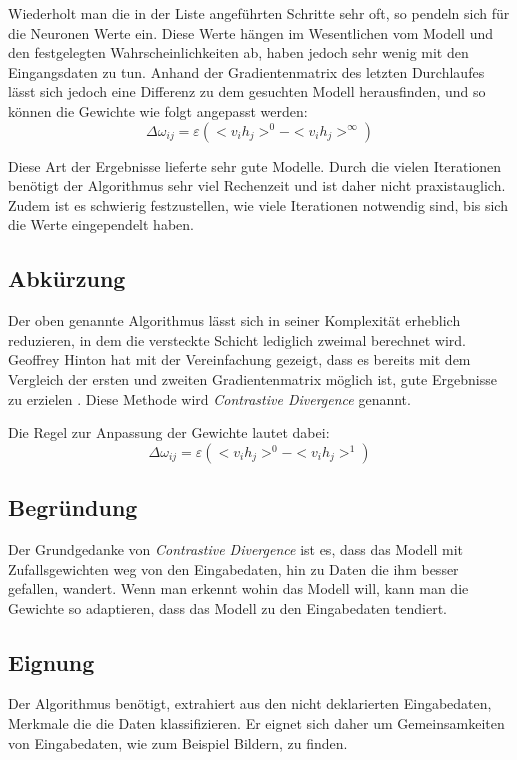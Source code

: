 Wiederholt man die in der Liste angeführten Schritte sehr oft, so pendeln sich für die Neuronen Werte ein. Diese Werte hängen im Wesentlichen vom Modell und den festgelegten Wahrscheinlichkeiten ab, haben jedoch sehr wenig mit den Eingangsdaten zu tun. Anhand der Gradientenmatrix des letzten Durchlaufes lässt sich jedoch eine Differenz zu dem gesuchten Modell herausfinden, und so können die Gewichte wie folgt angepasst werden:
$$\Delta\omega_{ij} = \varepsilon (<v_ih_j>^0 -  <v_ih_j>^\infty)$$

Diese Art der Ergebnisse lieferte sehr gute Modelle. Durch die vielen Iterationen benötigt der Algorithmus sehr viel Rechenzeit und ist daher nicht praxistauglich. Zudem ist es schwierig festzustellen, wie viele Iterationen notwendig sind, bis sich die Werte eingependelt haben.

\subsection{Abkürzung}

Der oben genannte Algorithmus lässt sich in seiner Komplexität erheblich reduzieren, in dem die versteckte Schicht lediglich zweimal berechnet wird. Geoffrey Hinton hat mit der Vereinfachung gezeigt, dass es bereits mit dem Vergleich der ersten und zweiten Gradientenmatrix möglich ist, gute Ergebnisse zu erzielen \citep{ContrustiveDivergence}. Diese Methode wird \emph{Contrastive Divergence} genannt.

Die Regel zur Anpassung der Gewichte lautet dabei:
$$\Delta\omega_{ij} = \varepsilon (<v_ih_j>^0 -  <v_ih_j>^1)$$

\subsection{Begründung}

Der Grundgedanke von \emph{Contrastive Divergence} ist es, dass das Modell mit Zufallsgewichten weg von den Eingabedaten, hin zu Daten die ihm besser gefallen, wandert. Wenn man erkennt wohin das Modell will, kann man die Gewichte so adaptieren, dass das Modell zu den Eingabedaten tendiert.

\subsection{Eignung}

Der Algorithmus benötigt, extrahiert aus den nicht deklarierten Eingabedaten, Merkmale die die Daten klassifizieren. Er eignet sich daher um Gemeinsamkeiten von Eingabedaten, wie zum Beispiel Bildern, zu finden.

